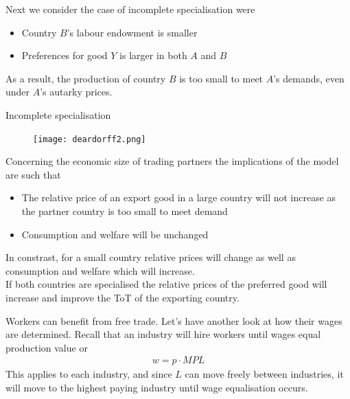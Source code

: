 \documentclass{beamer}
\begin{document}
\begin{frame}
 Next we consider the case of incomplete specialisation were
 \begin{itemize}
   \item Country $B$'s labour endowment is smaller
   \item Preferences for good $Y$ is larger in both $A$ and $B$
 \end{itemize}
 \medskip
 As a result, the production of country $B$ is too small to meet $A$'s demands, even under $A$'s autarky prices.
\end{frame}

\begin{frame}{Incomplete specialisation}
  \begin{figure}
    \texttt{[image: deardorff2.png]}
  \end{figure}
\end{frame}

\begin{frame}
  Concerning the economic size of trading partners the implications of the model are such that
  \begin{itemize}
    \item The relative price of an export good in a large country will not increase as the partner country is too small to meet demand
    \item Consumption and welfare will be unchanged
  \end{itemize}
  \medskip
  In constrast, for a small country relative prices will change as well as consumption and welfare which will increase.\\
  \medskip
  If both countries are specialised the relative prices of the preferred good will increase and improve the ToT of the exporting country. 
\end{frame}


\begin{frame}
  Workers can benefit from free trade.
  Let's have another look at how their wages are determined.
  Recall that an industry will hire workers until wages equal production value or
  \begin{align*}
    w=p \cdot MPL
  \end{align*}
  \medskip
  This applies to each industry, and since $L$ can move freely between industries, it will move to the highest paying industry until wage equalisation occurs. 
\end{frame}
\end{document}
